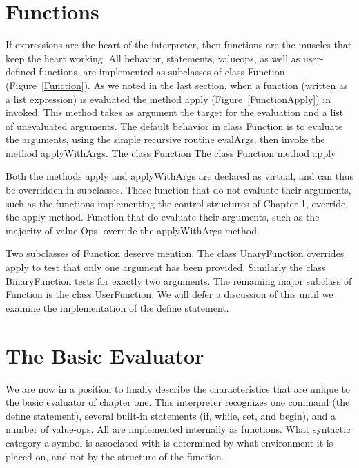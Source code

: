 \section{Functions}

If expressions are the heart of the interpreter, then functions are the muscles
that keep the heart working.  All behavior, statements, valueops, as well as
user-defined functions, are implemented as subclasses of class {\sf Function}
(Figure~\ref{Function}).  As we noted in the last section, when a function
(written as a list expression) is evaluated the method {\sf apply}
(Figure~\ref{FunctionApply}) in invoked.  This method takes as argument the
target for the evaluation and a list of unevaluated arguments.  The default
behavior in class {\sf Function} is to evaluate the arguments, using the simple
recursive routine {\sf evalArgs}, then invoke the method {\sf applyWithArgs}.
%
{The class {\sf Function}}
%
{The class {\sf Function} method {\sf apply}}

Both the methods {\sf apply} and {\sf applyWithArgs} are declared as virtual,
and can thus be overridden in subclasses.  Those function that do not evaluate
their arguments, such as the functions implementing the control structures of
Chapter 1, override the {\sf apply} method.  Function that do evaluate their
arguments, such as the majority of value-Ops, override the {\sf applyWithArgs}
method.

Two subclasses of {\sf Function} deserve mention.  The class {\sf UnaryFunction}
overrides {\sf apply} to test that only one argument has been provided.
Similarly the class {\sf BinaryFunction} tests for exactly two arguments.  The
remaining major subclass of {\sf Function} is the class {\sf UserFunction}.  We
will defer a discussion of this until we examine the implementation of the {\sf
    define} statement.

\section{The Basic Evaluator}

We are now in a position to finally describe the characteristics that are unique
to the basic evaluator of chapter one.  This interpreter recognizes one command
(the {\sf define} statement), several built-in statements ({\sf if, while, set},
and {\sf begin}), and a number of value-ops.  All are implemented internally as
functions.  What syntactic category a symbol is associated with is determined by
what environment it is placed on, and not by the structure of the function.

